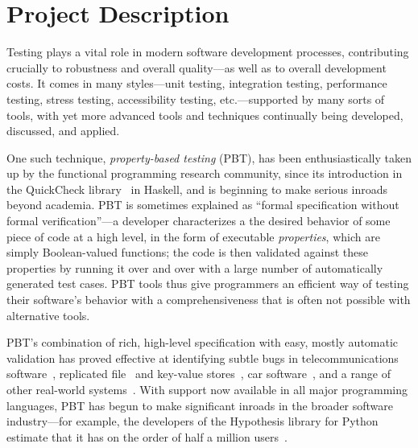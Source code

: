\section{Project Description }

\iflater{}\fi

Testing plays a vital role in modern software development processes,
contributing crucially to robustness and overall quality---as well as
to overall development costs.
%
It comes in many styles---unit testing, integration testing,
performance testing, stress testing, accessibility testing,
etc.---supported by many sorts of tools, with yet more advanced tools
and techniques continually being developed, discussed, and applied.

One such technique, {\em property-based testing} (PBT), has been
enthusiastically taken up by the functional programming research
community, since its introduction in the QuickCheck
library~\cite{ClaessenHughes00} in Haskell, and is beginning to make
serious inroads beyond academia.
%
PBT is sometimes explained as ``formal specification without formal
verification''---a developer characterizes a the desired behavior of
some piece of code at a high level, in the form of executable {\em
  properties}, which are simply Boolean-valued functions; the code is
then validated against these properties by running it over and over
with a large number of automatically generated test cases.
%
PBT tools thus give programmers an efficient way of testing their
software's behavior with a comprehensiveness that is often not
possible with alternative tools.

PBT's combination of rich, high-level specification with easy, mostly
automatic validation has proved effective at identifying subtle
bugs in telecommunications software~\cite{arts2006testing}, replicated
file~\cite{hughes2014mysteries} and key-value
stores~\cite{Bornholt2021}, car software~\cite{arts2015testing}, and a range
of other real-world systems~\cite{hughes2016experiences}. With support
now available in all major programming languages, PBT has
begun to make significant inroads in the broader software
industry---for example, the developers of the Hypothesis library for
Python estimate that it has on the order of half a million
users~\cite{ZacPersonalCommunication}.

